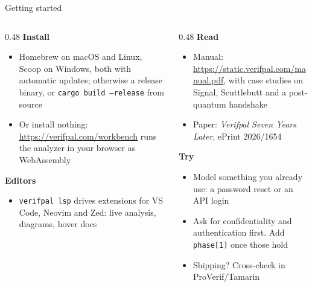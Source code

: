 \ifdefined\PRESENTATION\else\PassOptionsToClass{handout}{beamer}\fi\documentclass[aspectratio=169, lualatex]{beamer}
\begin{document}
\begin{frame}{Getting started}
	\footnotesize
	\begin{columns}[t]
		\begin{column}{0.48\textwidth}
			\textbf{Install}
			\begin{itemize}
				\item Homebrew on macOS and Linux, Scoop on Windows, both with automatic updates; otherwise a release binary, or \texttt{cargo build --release} from source
				\item Or install nothing: \url{https://verifpal.com/workbench} runs the analyzer in your browser as WebAssembly
			\end{itemize}
			\vspace{0.3em}
			\textbf{Editors}
			\begin{itemize}
				\item \texttt{verifpal lsp} drives extensions for VS Code, Neovim and Zed: live analysis, diagrams, hover docs
			\end{itemize}
		\end{column}
		\begin{column}{0.48\textwidth}
			\textbf{Read}
			\begin{itemize}
				\item Manual: \url{https://static.verifpal.com/manual.pdf}, with case studies on Signal, Scuttlebutt and a post-quantum handshake
				\item Paper: \textit{Verifpal Seven Years Later}, ePrint 2026/1654
			\end{itemize}
			\vspace{0.1em}
			\textbf{Try}
			\begin{itemize}
				\item Model something you already use: a password reset or an API login
				\item Ask for confidentiality and authentication first. Add \texttt{phase[1]} once those hold
				\item Shipping? Cross-check in ProVerif/Tamarin
			\end{itemize}
		\end{column}
	\end{columns}
\end{frame}
\end{document}
